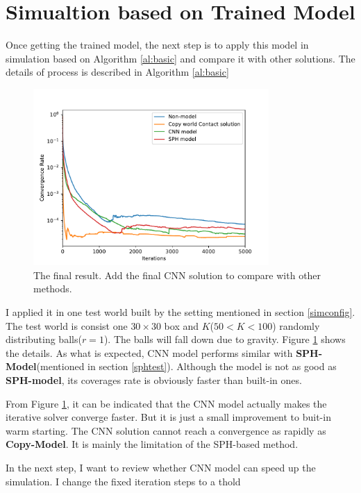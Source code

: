 \section{Simualtion based on Trained Model}
Once getting the trained model, the next step is to apply this model in simulation based on Algorithm \ref{al:basic} and compare it with other solutions. The details of process is described in Algorithm \ref{al:basic}
\begin{figure}[!h]
    \centering
    \includegraphics[width=0.8\textwidth]{Figures/same_world.pdf}
    \caption{The final result. Add the final CNN solution to compare with other methods.}
    \label{testoneworld}
\end{figure}

I applied it in one test world built by the setting mentioned in section \ref{simconfig}. The test world is consist one $30 \times 30 $ box and $K$($50<K<100$) randomly distributing balls($r=1$). The balls will fall down due to gravity. Figure \ref{testoneworld} shows the details. As what is expected, CNN model performs similar with \textbf{SPH-Model}(mentioned in section \ref{sphtest}). Although the model is not as good as \textbf{SPH-model}, its coverages rate is obviously faster than built-in ones. 

From Figure \ref{testoneworld}, it can be indicated that the CNN model actually makes the iterative solver converge faster. But it is just a small improvement to buit-in warm starting. The CNN solution cannot reach a convergence as rapidly as \textbf{Copy-Model}. It is mainly the limitation of the SPH-based method. 

In the next step, I want to review whether CNN model can speed up the simulation. I change the fixed iteration steps to a thold 

